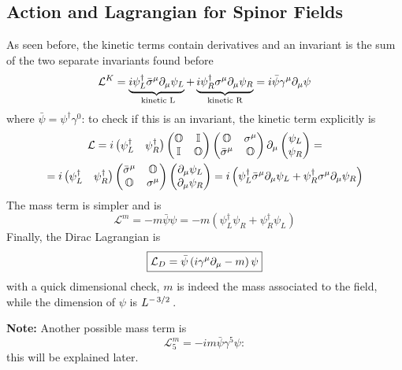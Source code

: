 \subsection{Action and Lagrangian for Spinor Fields}
As seen before, the kinetic terms contain derivatives and an invariant is the
sum of the two separate invariants found before
$$\mathcal{L}^K=\underbrace{i\psi_L^\dagger\bar\sigma^\mu\partial_\mu\psi_L}_{\text{
kinetic L}}+
\underbrace{i\psi_R^\dagger\sigma^\mu\partial_\mu\psi_R}_{\text{kinetic R}}=
i\bar\psi\gamma^\mu\partial_\mu\psi$$
where $\bar\psi = \psi^\dagger\gamma^0$: to check if this is an invariant, the
kinetic term explicitly is
\begin{gather*}
\mathcal{L}=i\begin{pmatrix}
    \psi_L^\dagger&\psi_R^\dagger
\end{pmatrix}\begin{pmatrix}
    \mathbb{O}&\mathbb{I}\\
    \mathbb{I}&\mathbb{O}
\end{pmatrix}\begin{pmatrix}
    \mathbb{O}&\sigma^\mu\\
    \bar\sigma^\mu&\mathbb{O}
\end{pmatrix}
\partial_\mu\begin{pmatrix}
\psi_L\\ \psi_R
\end{pmatrix}=\\
=i\begin{pmatrix}
    \psi_L^\dagger&\psi_R^\dagger
\end{pmatrix}\begin{pmatrix}
    \bar\sigma^\mu&\mathbb{O}\\
    \mathbb{O}&\sigma^\mu
\end{pmatrix}\begin{pmatrix}
\partial_\mu\psi_L\\ \partial_\mu\psi_R
\end{pmatrix} = i\left(\psi_L^\dagger\bar\sigma^\mu\partial_\mu\psi_L+
\psi_R^\dagger\sigma^\mu\partial_\mu\psi_R\right)
\end{gather*}
The mass term is simpler and is
$$\mathcal{L}^m = -m\bar\psi\psi = -m\left(\psi_L^\dagger\psi_R+\psi_R^\dagger
\psi_L\right)$$
Finally, the Dirac Lagrangian is
$$\boxed{\mathcal{L}_D = \bar\psi\left(i\gamma^\mu\partial_\mu - m\right)\psi}$$
with a quick dimensional check, $m$ is indeed the mass associated to the field,
while the dimension of $\psi$ is $L^{-\flatfrac{3}{2}}$.

\textbf{Note:} Another possible mass term is
$$\mathcal{L}^m_5 = -im\bar\psi\gamma^5\psi:$$
this will be explained later.

